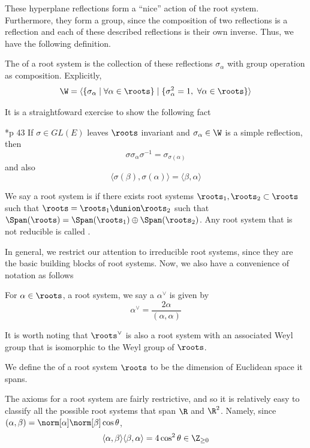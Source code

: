 \documentclass[11pt,leqno,oneside]{amsart}
\numberwithin{thm}{section}
\begin{document}
These hyperplane reflections form a ``nice''
action of the root system. Furthermore, 
they form a group, since the composition of two reflections is a
reflection and each of these described reflections is their own
inverse. Thus, we have the following definition.
\begin{defn}
  The  of a root system is the collection of these
  reflections $\sigma_\alpha$ with group operation as
  composition. Explicitly, \[
    \W = \langle \{\sigma_\alpha \mid \forall \alpha \in \roots\} \mid
    \{\sigma_\alpha^2 = 1, \ \forall \alpha \in \roots\} \rangle
  \]
\end{defn}
It is a straightfoward exercise to show the following fact
\begin{lem}\label{weyl-gp-conj}
  \cite{humph}*{p 43} If $\sigma \in GL(E)$ leaves \(\roots\) invariant and $\sigma_\alpha \in
  \W$ is a simple reflection, then \[
    \sigma \sigma_\alpha \sigma^{-1} = \sigma_{\sigma(\alpha)}
  \]
  and also \[
    \langle \sigma(\beta), \sigma(\alpha) \rangle = \langle \beta, \alpha \rangle
  \]
\end{lem}
\begin{defn}
  We say a root system is  if there exists root systems
  \(\roots_1, \roots_2 \subset \roots\) such that \(\roots = \roots_1 \dunion
  \roots_2\) such that \(\Span(\roots) = \Span(\roots_1) \oplus
  \Span(\roots_2)\). Any root system that is not reducible is called
  . 
\end{defn}
In general, we restrict our attention to irreducible root systems,
since they are the basic building blocks of root systems.
Now, we also have a convenience of notation as follows
\begin{defn}
   For $\alpha \in \roots$, a root system, we say a 
   $\alpha^\vee$ is given by \[ 
    \alpha^\vee = \frac{2 \alpha}{(\alpha, \alpha)}
  \]
\end{defn}
It is worth noting that $\roots^\vee$ is also a root system with an
associated Weyl group that is isomorphic to the Weyl group of $\roots$.
\begin{defn}
  We define the  of a root system $\roots$ to be the dimension
  of Euclidean space it spans.
\end{defn}
The axioms for a root system are fairly restrictive, and so it is
relatively easy to classify all the possible root systems that span
$\R$ and $\R^2$. Namely, since \((\alpha,\beta) =
\norm[\alpha]\norm[\beta] \cos \theta\), \[
  \langle \alpha,\beta \rangle \langle \beta,\alpha \rangle = 4 \cos^2
  \theta \in \Z_{\geq 0}
\]
\end{document}
